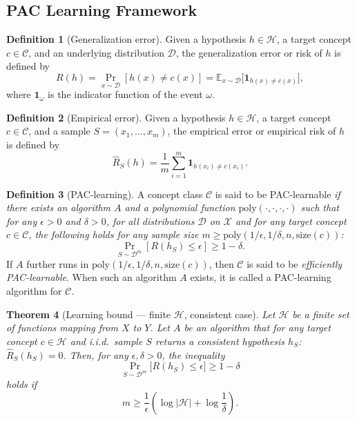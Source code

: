 \documentclass[12pt]{article}
\theoremstyle{definition} %
\newtheorem{definition}{Definition}[section]
\theoremstyle{plain} %
\newtheorem{theorem}[definition]{Theorem}
\theoremstyle{remark} %
\begin{document}
\begin{CJK}{UTF8}{gbsn}
\section{PAC Learning Framework}

\begin{definition}[Generalization error]
Given a hypothesis $h \in \mathcal{H}$, a target concept $c \in \mathcal{C}$,  
and an underlying distribution $\mathcal{D}$, the generalization error or risk of $h$ is defined by
\[
R(h) = \Pr_{x \sim \mathcal{D}}[h(x) \neq c(x)] 
     = \mathbb{E}_{x \sim \mathcal{D}} \big[ \mathbf{1}_{h(x) \neq c(x)} \big],
\]
where $\mathbf{1}_\omega$ is the indicator function of the event $\omega$.
\end{definition}

\begin{definition}[Empirical error]
Given a hypothesis $h \in \mathcal{H}$, a target concept $c \in \mathcal{C}$, 
and a sample $S = (x_1, \ldots, x_m)$, the empirical error or empirical risk of $h$ is defined by
\[
\hat{R}_S(h) = \frac{1}{m} \sum_{i=1}^m \mathbf{1}_{h(x_i) \neq c(x_i)}.
\]
\end{definition}

\begin{definition}[PAC-learning]
A concept class $\mathcal{C}$ is said to be PAC-learnable \emph{if there exists an algorithm $A$ and a polynomial function $\mathrm{poly}(\cdot,\cdot,\cdot,\cdot)$ such that for any $\epsilon > 0$ and $\delta > 0$, for all distributions $\mathcal{D}$ on $\mathcal{X}$ and for any target concept $c \in \mathcal{C}$, the following holds for any sample size $m \geq \mathrm{poly}(1/\epsilon, 1/\delta, n, \mathrm{size}(c))$:}
\[
\Pr_{S \sim \mathcal{D}^m}\!\left[ R(h_S) \leq \epsilon \right] \geq 1 - \delta.
\]
If $A$ further runs in $\mathrm{poly}(1/\epsilon, 1/\delta, n, \mathrm{size}(c))$, 
then $\mathcal{C}$ is said to be \emph{efficiently PAC-learnable}.
When such an algorithm $A$ exists, it is called a PAC-learning algorithm for $\mathcal{C}$.
\end{definition}

\begin{theorem}[Learning bound --- finite $\mathcal{H}$, consistent case]
Let $\mathcal{H}$ be a finite set of functions mapping from $X$ to $Y$. 
Let $A$ be an algorithm that for any target concept $c \in \mathcal{H}$ 
and i.i.d.\ sample $S$ returns a consistent hypothesis $h_S$: 
$\hat{R}_S(h_S) = 0$. Then, for any $\epsilon, \delta > 0$, 
the inequality
\[
\Pr_{S \sim \mathcal{D}^m}\!\big[ R(h_S) \leq \epsilon \big] \geq 1 - \delta
\]
holds if
\[
m \geq \frac{1}{\epsilon} \left( \log |\mathcal{H}| + \log \frac{1}{\delta} \right).
\tag{2.8}
\]


\end{theorem}
\end{CJK}
\end{document}

